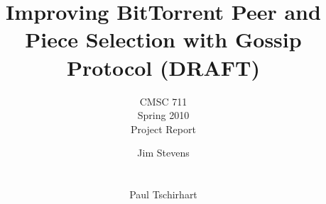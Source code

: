 \documentclass[twocolumn]{sig-alternate}
\begin{document}
\title{Improving BitTorrent Peer and Piece Selection with Gossip Protocol (DRAFT)}

\subtitle{CMSC 711 \\ Spring 2010 \\ Project Report}

\author{ 
\alignauthor
Jim Stevens\\
	\\
	\\
\alignauthor
Paul Tschirhart\\
	\\
}

\maketitle














\end{document}
